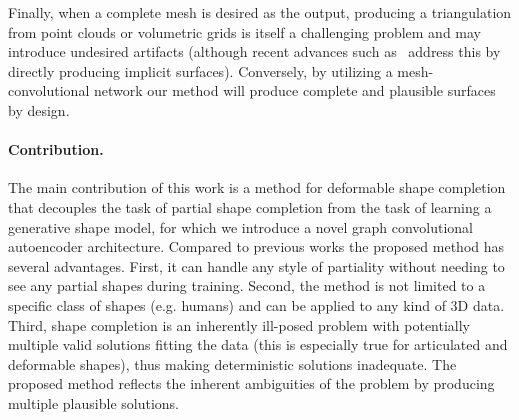 Finally, when a complete mesh is desired as the output, producing a triangulation from point clouds or volumetric grids is itself a challenging problem and may introduce undesired artifacts (although recent advances such as~\cite{dai2016shape} address this by directly producing implicit surfaces). Conversely, by utilizing a mesh-convolutional network our method will produce complete and plausible surfaces by design.  

\paragraph{Contribution.} The main contribution of this work is a method for deformable shape completion that decouples the task of partial shape completion from the task of learning a generative shape model, for which we introduce a novel graph convolutional autoencoder architecture. Compared to previous works the proposed method has several advantages. First, it can handle any style of partiality without needing to see any partial shapes during training. Second, the method is not limited to a specific class of shapes (e.g. humans) and can be applied to any kind of 3D data. Third, shape completion is an inherently ill-posed problem with potentially multiple valid solutions fitting the data (this is especially true for articulated and deformable shapes), thus making deterministic solutions inadequate. The proposed method reflects the inherent ambiguities of the problem by producing multiple plausible solutions.